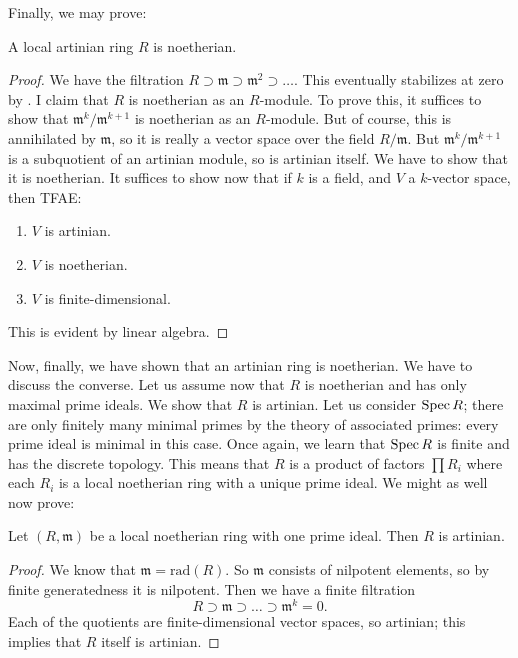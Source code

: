 Finally, we may prove:

\begin{lemma} 
A local artinian ring $R$ is noetherian.
\end{lemma} 
\begin{proof} 
We have the filtration $R \supset \mathfrak{m} \supset \mathfrak{m}^2 \supset
\dots$. This eventually stabilizes at zero by . I
claim that $R$ is noetherian as an $R$-module. To prove this, it suffices to
show that $\mathfrak{m}^k/\mathfrak{m}^{k+1}$ is noetherian as an $R$-module.
But of course, this is annihilated by $\mathfrak{m}$, so it is really a vector
space over the field $R/\mathfrak{m}$. But $\mathfrak{m}^k/\mathfrak{m}^{k+1}$
is a subquotient of an artinian module, so is artinian itself. We have to show
that it is noetherian. 
It suffices to show now that if $k$ is a field, and $V$ a $k$-vector space,
then TFAE:
\begin{enumerate}
\item $V$ is artinian. 
\item $V$ is noetherian.
\item $V$ is finite-dimensional.
\end{enumerate}
This is evident by linear algebra. 	
\end{proof} 

Now, finally, we have shown that an artinian ring is noetherian. We have to
discuss the converse. Let us assume now that $R$ is noetherian and has only
maximal prime ideals. We show that $R$ is artinian. Let us consider $\operatorname{Spec} R$;
there are only finitely many minimal primes by the theory of associated
primes: every prime ideal is minimal in this case. Once again, we learn that $\operatorname{Spec} R$
is finite and has the discrete topology. This means that $R$ is a product of
factors $\prod R_i$ where each $R_i$ is a local noetherian ring with a unique
prime ideal. We might as well now prove:

\begin{lemma} 
Let $(R, \mathfrak{m})$ be a local noetherian ring with one prime ideal. Then
$R$ is artinian.
\end{lemma} 
\begin{proof} 
We know that $\mathfrak{m} = \mathrm{rad}(R)$. So $\mathfrak{m}$ consists of
nilpotent elements, so by finite generatedness it is nilpotent.  Then we have a
finite filtration
\[ R \supset \mathfrak{m} \supset \dots \supset \mathfrak{m}^k = 0.  \]
Each of the quotients are finite-dimensional vector spaces, so artinian; this
implies that $R$ itself is artinian. 
\end{proof} 



